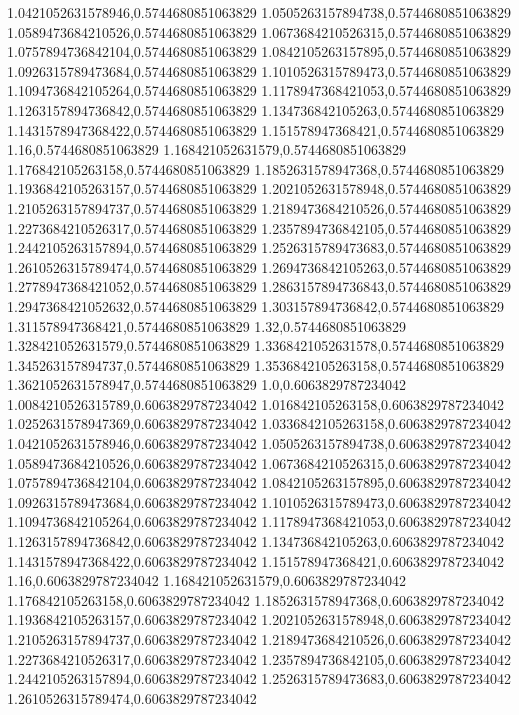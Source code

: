 1.0421052631578946,0.5744680851063829
1.0505263157894738,0.5744680851063829
1.0589473684210526,0.5744680851063829
1.0673684210526315,0.5744680851063829
1.0757894736842104,0.5744680851063829
1.0842105263157895,0.5744680851063829
1.0926315789473684,0.5744680851063829
1.1010526315789473,0.5744680851063829
1.1094736842105264,0.5744680851063829
1.1178947368421053,0.5744680851063829
1.1263157894736842,0.5744680851063829
1.134736842105263,0.5744680851063829
1.1431578947368422,0.5744680851063829
1.151578947368421,0.5744680851063829
1.16,0.5744680851063829
1.168421052631579,0.5744680851063829
1.176842105263158,0.5744680851063829
1.1852631578947368,0.5744680851063829
1.1936842105263157,0.5744680851063829
1.2021052631578948,0.5744680851063829
1.2105263157894737,0.5744680851063829
1.2189473684210526,0.5744680851063829
1.2273684210526317,0.5744680851063829
1.2357894736842105,0.5744680851063829
1.2442105263157894,0.5744680851063829
1.2526315789473683,0.5744680851063829
1.2610526315789474,0.5744680851063829
1.2694736842105263,0.5744680851063829
1.2778947368421052,0.5744680851063829
1.2863157894736843,0.5744680851063829
1.2947368421052632,0.5744680851063829
1.303157894736842,0.5744680851063829
1.311578947368421,0.5744680851063829
1.32,0.5744680851063829
1.328421052631579,0.5744680851063829
1.3368421052631578,0.5744680851063829
1.345263157894737,0.5744680851063829
1.3536842105263158,0.5744680851063829
1.3621052631578947,0.5744680851063829
1.0,0.6063829787234042
1.0084210526315789,0.6063829787234042
1.016842105263158,0.6063829787234042
1.0252631578947369,0.6063829787234042
1.0336842105263158,0.6063829787234042
1.0421052631578946,0.6063829787234042
1.0505263157894738,0.6063829787234042
1.0589473684210526,0.6063829787234042
1.0673684210526315,0.6063829787234042
1.0757894736842104,0.6063829787234042
1.0842105263157895,0.6063829787234042
1.0926315789473684,0.6063829787234042
1.1010526315789473,0.6063829787234042
1.1094736842105264,0.6063829787234042
1.1178947368421053,0.6063829787234042
1.1263157894736842,0.6063829787234042
1.134736842105263,0.6063829787234042
1.1431578947368422,0.6063829787234042
1.151578947368421,0.6063829787234042
1.16,0.6063829787234042
1.168421052631579,0.6063829787234042
1.176842105263158,0.6063829787234042
1.1852631578947368,0.6063829787234042
1.1936842105263157,0.6063829787234042
1.2021052631578948,0.6063829787234042
1.2105263157894737,0.6063829787234042
1.2189473684210526,0.6063829787234042
1.2273684210526317,0.6063829787234042
1.2357894736842105,0.6063829787234042
1.2442105263157894,0.6063829787234042
1.2526315789473683,0.6063829787234042
1.2610526315789474,0.6063829787234042
